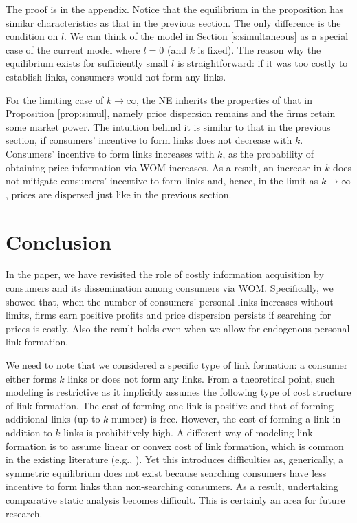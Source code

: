 \documentclass[12pt]{article}
\begin{document}
The proof is in the appendix.  Notice that the equilibrium in 
the proposition has similar characteristics as that in the 
previous section.  The only 
difference is the condition on $l$.  We can think of the model 
in Section \ref{s:simultaneous} as a special case of the current 
model where $l=0$ (and $k$ is fixed).  The reason why the 
equilibrium exists for sufficiently small $l$ is 
straightforward: if it was too costly to establish 
links, consumers would not form any links. 

For the limiting case of $k \to \infty$, the NE inherits the 
properties of that in Proposition \ref{prop:simul}, namely price 
dispersion remains and the firms retain some market power.  The 
intuition behind it is similar to that in the previous section, 
if consumers' incentive to form links does not decrease with 
$k$.   Consumers' incentive to form links increases with $k$, as 
the probability of obtaining price information via WOM 
increases.  As a result, an increase in $k$ does not mitigate 
consumers' incentive to form links and, hence, in the limit as 
$k\to \infty$, prices are dispersed just like in the previous 
section.



\section{Conclusion}\label{s:conclusion}

In the paper, we have revisited the role of costly information 
acquisition by consumers and its dissemination among consumers 
via WOM.  Specifically, we showed that, when the number of 
consumers' personal links increases without limits, firms earn 
positive profits and price dispersion persists if searching for 
prices is costly.  Also the result holds even when we allow for 
endogenous personal link formation.

We need to note that we considered a specific type of link 
formation: a consumer either forms $k$ links or does not form 
any links.  From a theoretical point, such modeling is 
restrictive as it implicitly assumes the following type 
of cost structure of link formation.  The cost of forming one 
link is positive and that of forming additional links (up to $k$ 
number) is free.  However, the cost of forming a link in 
addition to $k$ links is prohibitively high. A different way of 
modeling link formation is to assume linear or convex cost of 
link formation, which is common in the existing literature 
(e.g., \cite{galeottigoyal2010}).  Yet this introduces 
difficulties as, generically, a symmetric equilibrium does not 
exist because searching consumers have less incentive to form 
links than non-searching consumers.  As a result, undertaking 
comparative static analysis becomes difficult. This is certainly 
an area for future research.
\end{document}
